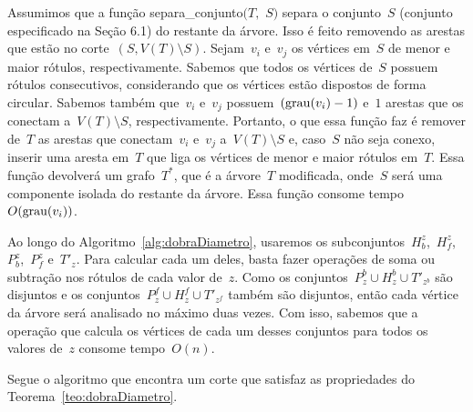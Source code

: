 		Assumimos que a função {\sc separa\_conjunto}$(T,$ $S)$
		separa o conjunto~$S$ (conjunto especificado na Seção 6.1) 
		do restante da árvore.
		Isso é feito removendo as arestas que estão no 
		corte~$(S,V(T)\setminus S)$.
		Sejam~$v_i$ e~$v_j$ os vértices em~$S$ de menor e maior rótulos, 
		respectivamente.
		Sabemos que todos os vértices de~$S$ possuem
		rótulos consecutivos,
		considerando que os vértices estão dispostos de forma circular.
		Sabemos também que~$v_i$ e~$v_j$ possuem~${(\mathrm{grau}(v_i)-1)}$
		e~$1$ arestas que os conectam a~$V(T)\setminus S$, respectivamente.
		Portanto, o que essa função faz é remover de~$T$ as arestas que 
		conectam~$v_i$ e~$v_j$ a~$V(T)\setminus S$ e, caso~$S$ não seja
		conexo, inserir uma aresta em~$T$ que liga os vértices de menor e maior 
		rótulos em~$T$.
		Essa função devolverá um grafo~$T^*$, que é a árvore~$T$ modificada,
		onde~$S$ será uma componente
		isolada do restante da árvore. 
		Essa função consome tempo~$O(\mathrm{grau}(v_i))$.

		Ao longo do Algoritmo~\ref{alg:dobraDiametro}, usaremos
		os subconjuntos~$H_b^z$,~$H_f^z$,~$P_b^z$,~$P_f^z$ e~$T'_z$.
		Para calcular cada um deles, basta fazer operações de soma ou subtração
		nos rótulos de cada valor de~$z$.
		Como os conjuntos~${P^b_z\cup H^b_z\cup T'_{z^b}}$ são disjuntos
		e os conjuntos~${P^f_z\cup H^f_z\cup T'_{z^f}}$ também são disjuntos,
		então cada vértice da árvore será analisado no máximo duas vezes.
		Com isso, sabemos que a operação que calcula os vértices de cada um desses 
		conjuntos para todos os valores de~$z$ consome tempo~$O(n)$.


		Segue o algoritmo que encontra um corte que satisfaz as propriedades do
		Teorema~\ref{teo:dobraDiametro}.

		\bigskip

